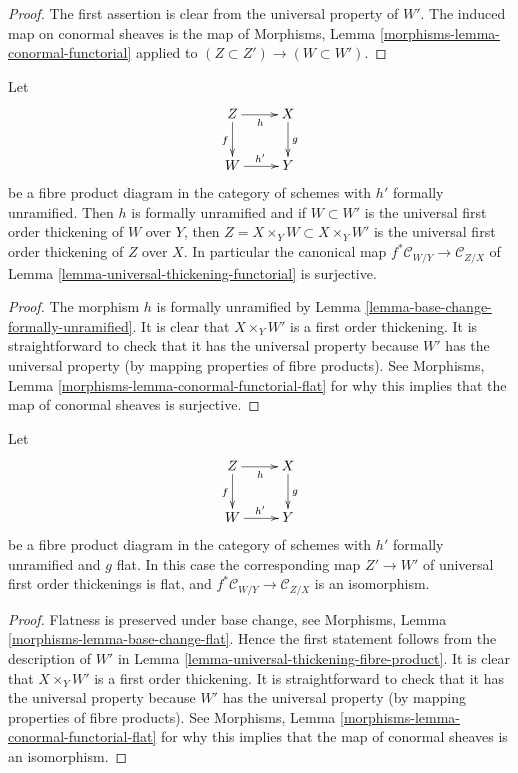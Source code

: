 \begin{proof}
The first assertion is clear from the universal property of $W'$.
The induced map on conormal sheaves is the map of
Morphisms, Lemma \ref{morphisms-lemma-conormal-functorial}
applied to $(Z \subset Z') \to (W \subset W')$.
\end{proof}

\begin{lemma}
\label{lemma-universal-thickening-fibre-product}
Let
$$
\xymatrix{
Z \ar[r]_h \ar[d]_f & X \ar[d]^g \\
W \ar[r]^{h'} & Y
}
$$
be a fibre product diagram in the category of schemes with
$h'$ formally unramified. Then $h$ is formally unramified and if
$W \subset W'$ is the universal first order thickening of $W$ over $Y$,
then $Z = X \times_Y W \subset X \times_Y W'$ is the universal
first order thickening of $Z$ over $X$. In particular the canonical map
$f^*\mathcal{C}_{W/Y} \to \mathcal{C}_{Z/X}$ of
Lemma \ref{lemma-universal-thickening-functorial}
is surjective.
\end{lemma}

\begin{proof}
The morphism $h$ is formally unramified by
Lemma \ref{lemma-base-change-formally-unramified}.
It is clear that $X \times_Y W'$ is a first order thickening.
It is straightforward to check that it has the universal property
because $W'$ has the universal property (by mapping properties of
fibre products). See
Morphisms, Lemma \ref{morphisms-lemma-conormal-functorial-flat}
for why this implies that the map of conormal sheaves is surjective.
\end{proof}

\begin{lemma}
\label{lemma-universal-thickening-fibre-product-flat}
Let
$$
\xymatrix{
Z \ar[r]_h \ar[d]_f & X \ar[d]^g \\
W \ar[r]^{h'} & Y
}
$$
be a fibre product diagram in the category of schemes with
$h'$ formally unramified and $g$ flat. In this case the corresponding
map $Z' \to W'$ of universal first order thickenings is flat, and
$f^*\mathcal{C}_{W/Y} \to \mathcal{C}_{Z/X}$ is an isomorphism.
\end{lemma}

\begin{proof}
Flatness is preserved under base change, see
Morphisms, Lemma \ref{morphisms-lemma-base-change-flat}.
Hence the first statement follows from the description of
$W'$ in Lemma \ref{lemma-universal-thickening-fibre-product}.
It is clear that $X \times_Y W'$ is a first order thickening.
It is straightforward to check that it has the universal property
because $W'$ has the universal property (by mapping properties of
fibre products). See
Morphisms, Lemma \ref{morphisms-lemma-conormal-functorial-flat}
for why this implies that the map of conormal sheaves is an isomorphism.
\end{proof}

